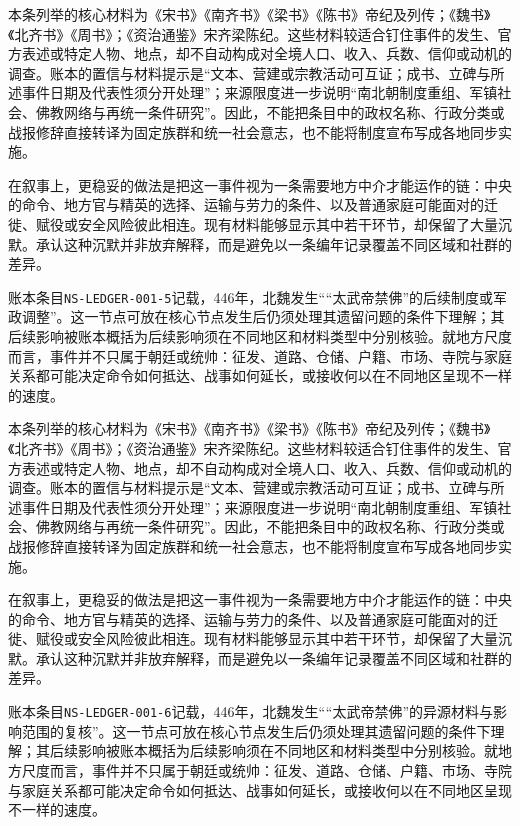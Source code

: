 本条列举的核心材料为《宋书》《南齐书》《梁书》《陈书》帝纪及列传；《魏书》《北齐书》《周书》；《资治通鉴》宋齐梁陈纪。这些材料较适合钉住事件的发生、官方表述或特定人物、地点，却不自动构成对全境人口、收入、兵数、信仰或动机的调查。账本的置信与材料提示是“文本、营建或宗教活动可互证；成书、立碑与所述事件日期及代表性须分开处理”；来源限度进一步说明“南北朝制度重组、军镇社会、佛教网络与再统一条件研究”。因此，不能把条目中的政权名称、行政分类或战报修辞直接转译为固定族群和统一社会意志，也不能将制度宣布写成各地同步实施。

在叙事上，更稳妥的做法是把这一事件视为一条需要地方中介才能运作的链：中央的命令、地方官与精英的选择、运输与劳力的条件、以及普通家庭可能面对的迁徙、赋役或安全风险彼此相连。现有材料能够显示其中若干环节，却保留了大量沉默。承认这种沉默并非放弃解释，而是避免以一条编年记录覆盖不同区域和社群的差异。

账本条目\texttt{NS-LEDGER-001-5}记载，446年，北魏发生““太武帝禁佛”的后续制度或军政调整”。这一节点可放在核心节点发生后仍须处理其遗留问题的条件下理解；其后续影响被账本概括为后续影响须在不同地区和材料类型中分别核验。就地方尺度而言，事件并不只属于朝廷或统帅：征发、道路、仓储、户籍、市场、寺院与家庭关系都可能决定命令如何抵达、战事如何延长，或接收何以在不同地区呈现不一样的速度。

本条列举的核心材料为《宋书》《南齐书》《梁书》《陈书》帝纪及列传；《魏书》《北齐书》《周书》；《资治通鉴》宋齐梁陈纪。这些材料较适合钉住事件的发生、官方表述或特定人物、地点，却不自动构成对全境人口、收入、兵数、信仰或动机的调查。账本的置信与材料提示是“文本、营建或宗教活动可互证；成书、立碑与所述事件日期及代表性须分开处理”；来源限度进一步说明“南北朝制度重组、军镇社会、佛教网络与再统一条件研究”。因此，不能把条目中的政权名称、行政分类或战报修辞直接转译为固定族群和统一社会意志，也不能将制度宣布写成各地同步实施。

在叙事上，更稳妥的做法是把这一事件视为一条需要地方中介才能运作的链：中央的命令、地方官与精英的选择、运输与劳力的条件、以及普通家庭可能面对的迁徙、赋役或安全风险彼此相连。现有材料能够显示其中若干环节，却保留了大量沉默。承认这种沉默并非放弃解释，而是避免以一条编年记录覆盖不同区域和社群的差异。

账本条目\texttt{NS-LEDGER-001-6}记载，446年，北魏发生““太武帝禁佛”的异源材料与影响范围的复核”。这一节点可放在核心节点发生后仍须处理其遗留问题的条件下理解；其后续影响被账本概括为后续影响须在不同地区和材料类型中分别核验。就地方尺度而言，事件并不只属于朝廷或统帅：征发、道路、仓储、户籍、市场、寺院与家庭关系都可能决定命令如何抵达、战事如何延长，或接收何以在不同地区呈现不一样的速度。

